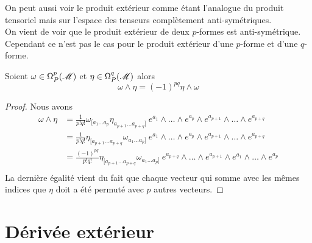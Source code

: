\documentclass[a4paper,11pt]{report}
\begin{document}
            On peut aussi voir le produit extérieur comme étant l'analogue du produit tensoriel mais sur l'espace des tenseurs complètement anti-symétriques.\\
            
            On vient de voir que le produit extérieur de deux $p$-formes est anti-symétrique. Cependant ce n'est pas le cas pour le produit extérieur d'une $p$-forme et d'une $q$-forme.
            
            \begin{prop}\begin{leftbar}
                Soient $\omega\in\Omega_P^p(\mathscr{M})$ et $\eta\in \Omega_P^q(\mathscr{M})$ alors
                \begin{equation}
                    \omega\wedge\eta = (-1)^{pq}\eta\wedge\omega
                \end{equation}
            \end{leftbar}\end{prop}
            
            \begin{proof} 
                Nous avons
                \begin{align}
                    \omega\wedge\eta &= \frac{1}{p!q!}\omega_{[a_1\dots a_p}\eta_{a_{p+1}\dots a_{p+q}]}~e^{a_1}\wedge \dots\wedge e^{a_p}\wedge e^{a_{p+1}}\wedge\dots\wedge e^{a_{p+q}} \\
                    &= \frac{1}{p!q!}\eta_{[a_{p+1}\dots a_{p+q}}\omega_{a_1\dots a_p]}~e^{a_1}\wedge \dots\wedge e^{a_p}\wedge e^{a_{p+1}}\wedge\dots\wedge e^{a_{p+q}}\\
                    &= \frac{(-1)^{pq}}{p!q!}\eta_{[a_{p+1}\dots a_{p+q}}\omega_{a_1\dots a_p]}~e^{a_{p+q}}\wedge \dots\wedge e^{a_{p+1}}\wedge e^{a_1}\wedge\dots\wedge e^{a_p}\\
                \end{align}
                La dernière égalité vient du fait que chaque vecteur qui somme avec les mêmes indices que $\eta$ doit a été permuté avec $p$ autres vecteurs.
            \end{proof}
        
        \section{Dérivée extérieur}
        
\end{document}
